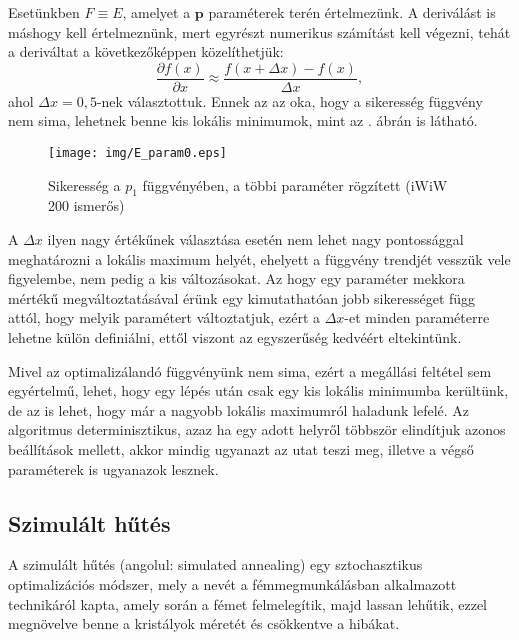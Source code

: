 \documentclass[12pt]{article}
\begin{document}
Esetünkben $F \equiv E$, amelyet a $\mathbf{p}$ paraméterek terén értelmezünk. A deriválást is máshogy kell értelmeznünk, mert egyrészt numerikus számítást kell végezni, tehát a deriváltat a következőképpen közelíthetjük:
\begin{equation}
	\frac{\partial f(x)}{\partial x} \approx \frac{f(x+\Delta x) - f(x)}{\Delta x},
\end{equation}
ahol $\Delta x = 0,5$-nek választottuk. Ennek az az oka, hogy a sikeresség függvény nem sima, lehetnek benne kis lokális minimumok, mint az . ábrán is látható. 
\begin{figure}[H]
	\centering
	\texttt{[image: img/E\_param0.eps]}
	\caption{Sikeresség a $p_1$ függvényében, a többi paraméter rögzített (iWiW 200 ismerős)}
	\label{E_param1}
\end{figure}
A $\Delta x$ ilyen nagy értékűnek választása esetén nem lehet nagy pontossággal meghatározni a lokális maximum helyét, ehelyett a függvény trendjét vesszük vele figyelembe, nem pedig a kis változásokat. Az hogy egy paraméter mekkora mértékű megváltoztatásával érünk egy kimutathatóan jobb sikerességet függ attól, hogy melyik paramétert változtatjuk, ezért a $\Delta x$-et minden paraméterre lehetne külön definiálni, ettől viszont az egyszerűség kedvéért eltekintünk.

Mivel az optimalizálandó függvényünk nem sima, ezért a megállási feltétel sem egyértelmű, lehet, hogy egy lépés után csak egy kis lokális minimumba kerültünk, de az is lehet, hogy már a nagyobb lokális maximumról haladunk lefelé.
Az algoritmus determinisztikus, azaz ha egy adott helyről többször elindítjuk azonos beállítások mellett, akkor mindig ugyanazt az utat teszi meg, illetve a végső paraméterek is ugyanazok lesznek.
\subsection{Szimulált hűtés}
A szimulált hűtés (angolul: simulated annealing) \cite{simulated_annealing} egy sztochasztikus optimalizációs módszer, mely a nevét a fémmegmunkálásban alkalmazott technikáról kapta, amely során a fémet felmelegítik, majd lassan lehűtik, ezzel megnövelve benne a kristályok méretét és csökkentve a hibákat.
\end{document}
